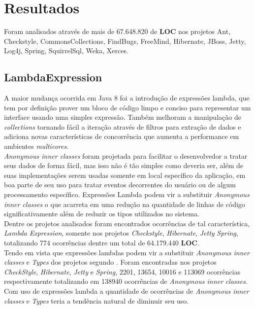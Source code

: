 \chapter {Resultados}
Foram analisados através de mais de 67.648.820 de \textbf{LOC} nos projetos Ant, Checkstyle, CommonsCollections,  FindBugs,  FreeMind,  Hibernate,  JBoss,  Jetty,  Log4j,  Spring,  SquirrelSql,  Weka,  Xerces.\\

\section{LambdaExpression}
A maior mudança ocorrida em Java 8 foi a introdução de expressões lambda, que tem por definição prover um bloco de código limpo e conciso para representar um interface usando uma simples expressão. Também melhoram a manipulação de \textit{collections} tornando fácil a iteração através de filtros para extração de dados e adiciona novas características de concorrência que aumenta a performance em ambientes \textit{multicores}.\\

\textit{Anonymous inner classes} foram projetada para facilitar o desenvolvedor a tratar seus dados de forma fácil, mas isso não é tão simples como deveria ser, além de suas implementações serem usadas somente em local específico da aplicação, em boa parte de seu uso para tratar eventos decorrentes do usuário ou de algum processamento específico. Expressões Lambda podem vir a substituir \textit{Anonymous inner classes} o que acarreta em uma redução na quantidade de linhas de código significativamente além de reduzir os tipos utilizados no sistema.\\

Dentre os projetos analisados foram encontrados ocorrências de tal característica, \textit{Lambda Expression}, somente nos projetos \textit{Checkstyle}, \textit{Hibernate}, \textit{Jetty} \textit{Spring}, totalizando 774 ocorrências dentre um total de 64.179.440 \textbf{LOC}.\\

Tendo em vista que expressões lambdas podem vir a substituir \textit{Anonymous inner classes} e \textit{Types} dos projetos segundo \cite{Java8Lambda}. Foram encontradas nos projetos \textit{CheckStyle}, \textit{Hibernate}, \textit{Jetty} e \textit{Spring}, 2201, 13654, 10016 e 113069 ocorrências respectivamente totalizando em 138940 ocorrências de \textit{Anonymous inner classes}. Com uso de expressões lambda a quantidade de ocorrências de \textit{Anonymous inner classes} e \textit{Types} teria a tendência natural de diminuir seu uso.\\

